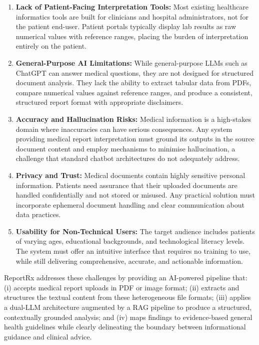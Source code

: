\begin{enumerate}
    \item \textbf{Lack of Patient-Facing Interpretation Tools:} Most existing healthcare informatics tools are built for clinicians and hospital administrators, not for the patient end-user. Patient portals typically display lab results as raw numerical values with reference ranges, placing the burden of interpretation entirely on the patient.
    \item \textbf{General-Purpose AI Limitations:} While general-purpose LLMs such as ChatGPT can answer medical questions, they are not designed for structured document analysis. They lack the ability to extract tabular data from PDFs, compare numerical values against reference ranges, and produce a consistent, structured report format with appropriate disclaimers.
    \item \textbf{Accuracy and Hallucination Risks:} Medical information is a high-stakes domain where inaccuracies can have serious consequences. Any system providing medical report interpretation must ground its outputs in the source document content and employ mechanisms to minimise hallucination, a challenge that standard chatbot architectures do not adequately address.
    \item \textbf{Privacy and Trust:} Medical documents contain highly sensitive personal information. Patients need assurance that their uploaded documents are handled confidentially and not stored or misused. Any practical solution must incorporate ephemeral document handling and clear communication about data practices.
    \item \textbf{Usability for Non-Technical Users:} The target audience includes patients of varying ages, educational backgrounds, and technological literacy levels. The system must offer an intuitive interface that requires no training to use, while still delivering comprehensive, accurate, and actionable information.
\end{enumerate}

ReportRx addresses these challenges by providing an AI-powered pipeline that: (i) accepts medical report uploads in PDF or image format; (ii) extracts and structures the textual content from these heterogeneous file formats; (iii) applies a dual-LLM architecture augmented by a RAG pipeline to produce a structured, contextually grounded analysis; and (iv) maps findings to evidence-based general health guidelines while clearly delineating the boundary between informational guidance and clinical advice.

